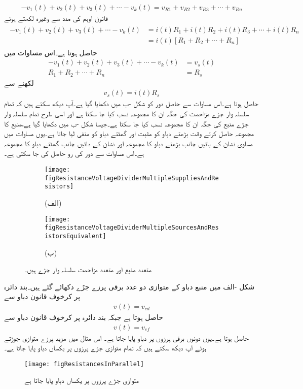 \begin{align}
-v_1(t)+v_2(t)+v_3(t)+\cdots-v_k(t)=v_{R1}+v_{R2}+v_{R3}+\cdots+v_{Rn}
\end{align}
قانون اوہم کی مدد سے  وغیرہ لکھتے ہوئے 
\begin{gather}
\begin{aligned}
-v_1(t)+v_2(t)+v_3(t)+\cdots-v_k(t)&=i(t) R_1+i(t) R_2+i(t) R_3+\cdots+i(t) R_n\\
&=i(t)\left[R_1+R_2+\cdots +R_n \right]
\end{aligned}
\end{gather}
حاصل ہوتا ہے۔اس مساوات میں 
\begin{align}
-v_1(t)+v_2(t)+v_3(t)+\cdots-v_k(t)&=v_s(t)\\
R_1+R_2+\cdots +R_n&=R_s
\end{align}
لکھنے سے
\begin{align}\label{مساوات_مزاحمتی_سلسلہ_وار_متعدد_مزاحمت_منبع_مساوی}
v_s(t)=i(t) R_s
\end{align}
حاصل ہوتا ہے۔اس مساوات سے حاصل دور کو شکل -ب میں دکھایا گیا ہے۔آپ دیکھ سکتے ہیں کہ تمام سلسلہ وار جڑے مزاحمت کی جگہ ان کا مجموعہ نسب کیا جا سکتا ہے اور اسی طرح تمام سلسلہ وار جڑے منبع کی جگہ ان کا مجموعہ نسب کیا جا سکتا ہے۔جیسا شکل -ب میں دکھایا گیا ہے،منبع کا مجموعہ حاصل کرتے وقت بڑھتے دباو کو مثبت اور گھٹتے دباو کو منفی لیا جاتا ہے۔یوں مساوات  میں مساوی نشان  کے بائیں جانب بڑھتے دباو کا مجموعہ اور نشان کے دائیں جانب گھٹتے دباو کا مجموعہ ہے۔اس مساوات سے دور کی رو  حاصل کی جا سکتی ہے۔
\begin{figure}
\centering
\begin{subfigure}{\textwidth}
\centering
\texttt{[image: figResistanceVoltageDividerMultipleSuppliesAndResistors]}
\caption*{(الف)}
\end{subfigure}
%
\begin{subfigure}{\textwidth}
\centering
\texttt{[image: figResistanceVoltageDividerMultipleSourcesAndResistorsEquivalent]}
\caption*{(ب)}
\end{subfigure}
\caption{متعدد منبع اور متعدد مزاحمت سلسلہ وار جڑے ہیں۔}
\label{شکل_مزاحمتی_متعدد_سلسلہ_وار_دور}
\end{figure}

شکل -الف میں منبع دباو کے متوازی دو عدد برقی پرزے جڑے دکھائے گئے ہیں۔بند دائرہ  پر کرخوف قانون دباو سے
\begin{align}
v(t)=v_{cd}
\end{align}
حاصل ہوتا ہے جبکہ بند دائرہ  پر کرخوف  قانون دباو سے
\begin{align}
v(t)=v_{ef}
\end{align}
حاصل ہوتا ہے۔یوں دونوں برقی پرزوں پر  دباو پایا جاتا ہے۔ اس مثال میں مزید پرزے متوازی جوڑتے ہوئے آپ دیکھ سکتے ہیں کہ تمام متوازی جڑے پرزوں پر یکساں دباو پایا جاتا ہے۔
\begin{figure}
\centering
\texttt{[image: figResistancesInParallel]}
\caption{متوازی جڑے پرزوں پر یکساں دباو پایا جاتا ہے}
\label{شکل_مزاحمتی_متوازی_جڑے_پرزے}
\end{figure}

